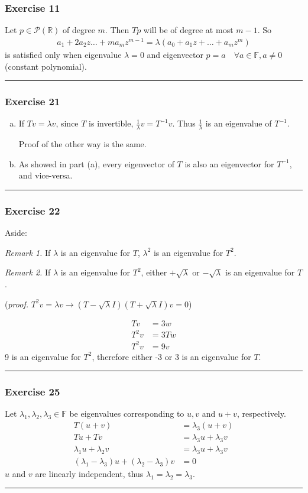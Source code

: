 \documentclass[12pt, letterpaper]{scrartcl}
\newcommand{\R}{\mathbb{R}}
\newcommand{\F}{\mathbb{F}}
\begin{document}
\subsubsection*{Exercise 11}
Let $p\in\mathcal{P}(\R)$ of degree $m$. Then $Tp$ will be of degree at most $m-1$. So
\begin{align*}
    a_1+2a_2z\dots+ma_mz^{m-1}=\lambda(a_0+a_1z+\dots+a_mz^m)
\end{align*}
is satisfied only when eigenvalue $\lambda=0$ and eigenvector $p=a \quad\forall a\in\F, a\neq0$ (constant polynomial).
\vskip1mm\hrule

\subsubsection*{Exercise 21}
\begin{enumerate}[(a)]
    \item 
    If $Tv=\lambda v$, since $T$ is invertible, $\frac{1}{\lambda}v=T^{-1}v$. Thus $\frac{1}{\lambda}$ is an eigenvalue of $T^{-1}$. 
    
    Proof of the other way is the same.

    \item As showed in part (a), every eigenvector of $T$ is also an eigenvector for $T^{-1}$, and vice-versa.
    
\end{enumerate}
\vskip1mm\hrule

\subsubsection*{Exercise 22}
{ \color{teal}
Aside:

\emph{Remark 1.} If $\lambda$ is an eigenvalue for $T$, $\lambda^2$ is an eigenvalue for $T^2$.

\emph{Remark 2.} If $\lambda$ is an eigenvalue for $T^2$, either $+\sqrt{\lambda}$ or $-\sqrt{\lambda}$ is an eigenvalue for $T$.

(\emph{proof.} $T^2v=\lambda v \rightarrow (T-\sqrt{\lambda}I)(T+\sqrt{\lambda}I)v=0$)
}
\begin{align*}
    Tv&=3w\\
    T^2v&=3Tw\\
    T^2v&=9v
\end{align*}
9 is an eigenvalue for $T^2$, therefore either -3 or 3 is an eigenvalue for $T$.
\vskip1mm\hrule

\subsubsection*{Exercise 25}
Let $\lambda_1,\lambda_2,\lambda_3\in\F$ be eigenvalues corresponding to $u, v$ and $u+v$, respectively.
\begin{align*}
    T(u+v) &= \lambda_3(u+v)\\
    Tu + Tv &= \lambda_3u+\lambda_3v\\ 
    \lambda_1u + \lambda_2v &= \lambda_3u+\lambda_3v\\
    (\lambda_1-\lambda_3)u+(\lambda_2-\lambda_3)v&=0
\end{align*}
$u$ and $v$ are linearly independent, thus $\lambda_1=\lambda_2=\lambda_3$.
\vskip1mm\hrule
\end{document}
